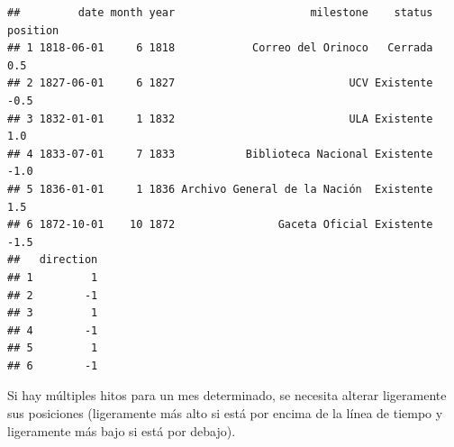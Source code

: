 \documentclass[]{article}
\newenvironment{Shaded}{\begin{snugshade}}{\end{snugshade}}
\newcommand{\DataTypeTok}[1]{\textcolor[rgb]{0.13,0.29,0.53}{#1}}
\newcommand{\DecValTok}[1]{\textcolor[rgb]{0.00,0.00,0.81}{#1}}
\newcommand{\FloatTok}[1]{\textcolor[rgb]{0.00,0.00,0.81}{#1}}
\newcommand{\KeywordTok}[1]{\textcolor[rgb]{0.13,0.29,0.53}{\textbf{#1}}}
\newcommand{\NormalTok}[1]{#1}
\newcommand{\OperatorTok}[1]{\textcolor[rgb]{0.81,0.36,0.00}{\textbf{#1}}}
\newcommand{\OtherTok}[1]{\textcolor[rgb]{0.56,0.35,0.01}{#1}}
\newcommand{\StringTok}[1]{\textcolor[rgb]{0.31,0.60,0.02}{#1}}
\begin{document}
\begin{Shaded}
\end{Shaded}

\begin{verbatim}
##         date month year                     milestone    status position
## 1 1818-06-01     6 1818            Correo del Orinoco   Cerrada      0.5
## 2 1827-06-01     6 1827                           UCV Existente     -0.5
## 3 1832-01-01     1 1832                           ULA Existente      1.0
## 4 1833-07-01     7 1833           Biblioteca Nacional Existente     -1.0
## 5 1836-01-01     1 1836 Archivo General de la Nación  Existente      1.5
## 6 1872-10-01    10 1872                Gaceta Oficial Existente     -1.5
##   direction
## 1         1
## 2        -1
## 3         1
## 4        -1
## 5         1
## 6        -1
\end{verbatim}

Si hay múltiples hitos para un mes determinado, se necesita alterar
ligeramente sus posiciones (ligeramente más alto si está por encima de
la línea de tiempo y ligeramente más bajo si está por debajo).
\end{document}
